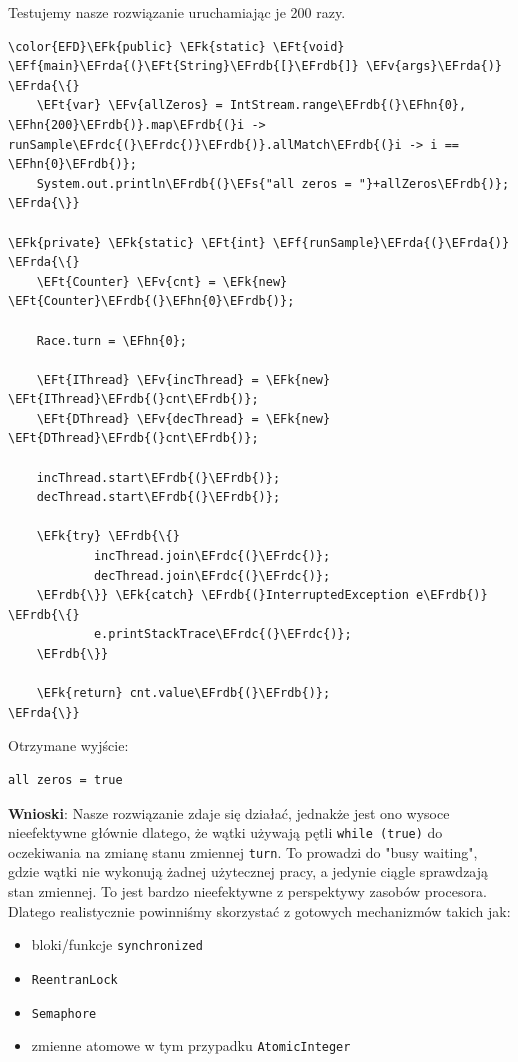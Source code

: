 \documentclass[11pt]{article}
\newcommand{\EFs}[1]{\textcolor{EFs}{#1}} %
\newcommand{\EFk}[1]{\textbf{#1}} %
\newcommand{\EFf}[1]{\textbf{#1}} %
\newcommand{\EFv}[1]{#1} %
\newcommand{\EFt}[1]{\textbf{#1}} %
\newcommand{\EFhn}[1]{\textcolor{EFhn}{\textbf{#1}}} %
\newcommand{\EFrda}[1]{\textcolor{EFrda}{#1}} %
\newcommand{\EFrdb}[1]{\textcolor{EFrdb}{#1}} %
\newcommand{\EFrdc}[1]{\textcolor{EFrdc}{#1}} %
\begin{document}
Testujemy nasze rozwiązanie uruchamiając je 200 razy.
\begin{Code}
\begin{Verbatim}
\color{EFD}\EFk{public} \EFk{static} \EFt{void} \EFf{main}\EFrda{(}\EFt{String}\EFrdb{[}\EFrdb{]} \EFv{args}\EFrda{)} \EFrda{\{}
    \EFt{var} \EFv{allZeros} = IntStream.range\EFrdb{(}\EFhn{0}, \EFhn{200}\EFrdb{)}.map\EFrdb{(}i -> runSample\EFrdc{(}\EFrdc{)}\EFrdb{)}.allMatch\EFrdb{(}i -> i == \EFhn{0}\EFrdb{)};
    System.out.println\EFrdb{(}\EFs{"all zeros = "}+allZeros\EFrdb{)};
\EFrda{\}}

\EFk{private} \EFk{static} \EFt{int} \EFf{runSample}\EFrda{(}\EFrda{)} \EFrda{\{}
    \EFt{Counter} \EFv{cnt} = \EFk{new} \EFt{Counter}\EFrdb{(}\EFhn{0}\EFrdb{)};

    Race.turn = \EFhn{0};

    \EFt{IThread} \EFv{incThread} = \EFk{new} \EFt{IThread}\EFrdb{(}cnt\EFrdb{)};
    \EFt{DThread} \EFv{decThread} = \EFk{new} \EFt{DThread}\EFrdb{(}cnt\EFrdb{)};

    incThread.start\EFrdb{(}\EFrdb{)};
    decThread.start\EFrdb{(}\EFrdb{)};

    \EFk{try} \EFrdb{\{}
            incThread.join\EFrdc{(}\EFrdc{)};
            decThread.join\EFrdc{(}\EFrdc{)};
    \EFrdb{\}} \EFk{catch} \EFrdb{(}InterruptedException e\EFrdb{)} \EFrdb{\{}
            e.printStackTrace\EFrdc{(}\EFrdc{)};
    \EFrdb{\}}

    \EFk{return} cnt.value\EFrdb{(}\EFrdb{)};
\EFrda{\}}
\end{Verbatim}
\end{Code}

Otrzymane wyjście:
\begin{tcolorbox}
\begin{Verbatim}
all zeros = true
\end{Verbatim}


\end{tcolorbox}\textbf{Wnioski}: Nasze rozwiązanie zdaje się działać, jednakże jest ono wysoce nieefektywne głównie dlatego, że
wątki używają pętli \texttt{while (true)} do oczekiwania na zmianę stanu zmiennej \texttt{turn}.
To prowadzi do "busy waiting", gdzie wątki nie wykonują żadnej użytecznej
pracy, a jedynie ciągle sprawdzają stan zmiennej. To jest bardzo nieefektywne z
perspektywy zasobów procesora. Dlatego realistycznie powinniśmy skorzystać z gotowych
mechanizmów takich jak:
\begin{itemize}
\item bloki/funkcje \texttt{synchronized}
\item \texttt{ReentranLock}
\item \texttt{Semaphore}
\item zmienne atomowe w tym przypadku \texttt{AtomicInteger}
\end{itemize}
\end{document}
